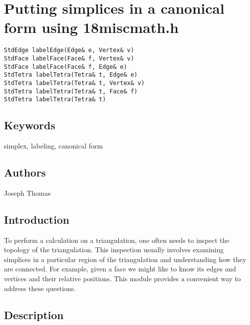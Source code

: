 
\chapter{Putting simplices in a canonical form using \char18miscmath.h}

\label{f0}{\small{\begin{verbatim} 
StdEdge labelEdge(Edge& e, Vertex& v)
StdFace labelFace(Face& f, Vertex& v)
StdFace labelFace(Face& f, Edge& e)
StdTetra labelTetra(Tetra& t, Edge& e)
StdTetra labelTetra(Tetra& t, Vertex& v)
StdTetra labelTetra(Tetra& t, Face& f)
StdTetra labelTetra(Tetra& t)
\end{verbatim}
}}

\section{Keywords}

simplex, labeling, canonical form

\section{Authors}

Joseph Thomas

\section{Introduction}

To perform a calculation on a triangulation, one often needs to inspect the topology of the triangulation. This inspection usually involves examining simplices in a particular region of the triangulation and understanding how they are connected. For example, given a face we might like to know its edges and vertices and their relative positions. This module provides a convenient way to address these questions.

\section{Description}

